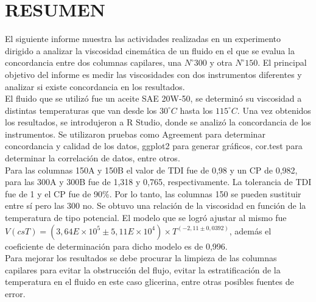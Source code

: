 \documentclass[12, letterpaper]{article}
\begin{document}
\tableofcontents

\pagebreak

\section{RESUMEN}

El siguiente informe muestra las actividades realizadas en un experimento dirigido a analizar la viscosidad cinemática de un fluido en el que se evalua la concordancia entre dos columnas capilares, una $N^{\circ}300$ y otra $N^{\circ}150$. El principal objetivo del informe es medir las viscosidades con dos instrumentos diferentes y analizar si existe concordancia en los resultados.\\
El fluido que se utilizó fue un aceite SAE 20W-50, se determinó su viscosidad a distintas temperaturas que van desde los $30^{\circ}C$ hasta los $115^{\circ}C$. Una vez obtenidos los resultados, se introdujeron a R Studio, donde se analizó la concordancia de los instrumentos. Se utilizaron pruebas como Agreement para determinar concordancia y calidad de los datos, ggplot2 para generar gráficos, cor.test para determinar la correlación de datos, entre otros.\\
Para las columnas 150A y 150B el valor de TDI fue de 0,98 y un CP de 0,982, para las 300A y 300B fue de 1,318 y 0,765, respectivamente. La tolerancia de TDI fue de 1 y el CP fue de 90\%. Por lo tanto, las columnas 150 se pueden sustituir entre sí pero las 300 no. Se obtuvo una relación de la viscosidad en función de la temperatura de tipo potencial. El modelo que se logró ajustar al mismo fue $V(csT)= (3,64E\times10^{5} \pm 5,11E\times10^{4}) \times T^{(-2,11 \pm 0,0392)}$, además el coeficiente de determinación para dicho modelo es de 0,996.\\ 
Para mejorar los resultados se debe procurar la limpieza de las columnas capilares para evitar la obstrucción del flujo, evitar la estratificación de la temperatura en el fluido en este caso glicerina, entre otras posibles fuentes de error.

\end{document}
